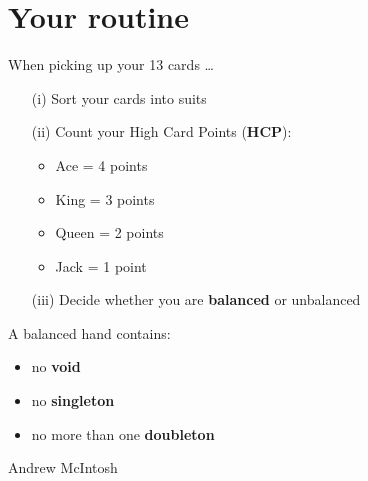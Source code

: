 \documentclass[12pt]{extarticle}
\begin{document}
\addtocounter{page}{2}

\begingroup
\centering
\section*{Your routine}
\endgroup

\noindent When picking up your 13 cards \ldots\\

\begin{enumerate}
\item[(i)] Sort your cards into suits
\item[(ii)] Count your High Card Points (\textbf{HCP}):
\begin{itemize}
\item Ace = 4 points
\item King = 3 points
\item Queen = 2 points
\item Jack = 1 point
\end{itemize}
\item[(iii)] Decide whether you are \textbf{balanced} or unbalanced
\end{enumerate}
A balanced hand contains:
\begin{itemize}
 \item no \textbf{void}
\item no \textbf{singleton}
\item no more than one \textbf{doubleton}
\end{itemize}
\begin{flushbottom}
 \begin{center}
 \tiny
 \textcopyright Andrew McIntosh
\end{center}
\end{flushbottom}
\end{document}
